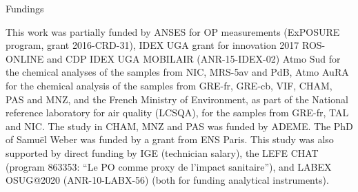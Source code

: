 \documentclass[acp]{copernicus}
\begin{document}
Fundings

This work was partially funded by ANSES for OP measurements (ExPOSURE
program, grant 2016-CRD-31), IDEX UGA grant for innovation 2017
ROS-ONLINE and CDP IDEX UGA MOBILAIR (ANR-15-IDEX-02) Atmo Sud for the
chemical analyses of the samples from NIC, MRS-5av and PdB, Atmo AuRA
for the chemical analysis of the samples from GRE-fr, GRE-cb, VIF, CHAM,
PAS and MNZ, and the French Ministry of Environment, as part of the
National reference laboratory for air quality (LCSQA), for the samples
from GRE-fr, TAL and NIC. The study in CHAM, MNZ and PAS was funded by
ADEME. The PhD of Samuël Weber was funded by a grant from ENS Paris.
This study was also supported by direct funding by IGE (technician
salary), the LEFE CHAT (program 863353: ``Le PO comme proxy de l'impact
sanitaire''), and LABEX OSUG@2020 (ANR-10-LABX-56) (both for funding
analytical instruments).




\dataavailability{} %








%
%

\end{document}
